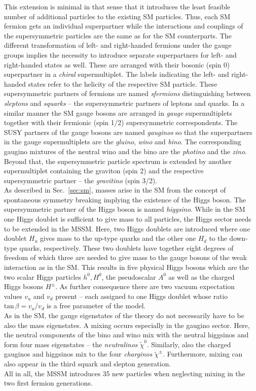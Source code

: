 This extension is minimal in that sense that it introduces the least feasible number of additional particles to the existing SM particles. Thus, each SM fermion gets an individual superpartner while the interactions and couplings of the supersymmetric particles are the same as for the SM counterparts. The different transformation of left- and right-handed fermions under the gauge groups implies the necessity to introduce separate superpartners for left- and right-handed states as well. These are arranged with their bosonic (spin 0) superpartner in a \textit{chiral} supermultiplet. The labels indicating the left- and right-handed states refer to the helicity of the respective SM particle. These supersymmetric partners of fermions are named \textit{sfermions} distinguishing between \textit{sleptons} and \textit{squarks} -- the supersymmetric partners of leptons and quarks. In a similar manner the SM gauge bosons are arranged in \textit{gauge} supermultiplets together with their fermionic (spin 1/2) supersymmetric correspondents. The SUSY partners of the gauge bosons are named \textit{gauginos} so that the superpartners in the gauge supermultiplets are the \textit{gluino}, \textit{wino} and \textit{bino}. The corresponding gaugino mixtures of the neutral wino and the bino are the \textit{photino} and the \textit{zino}. Beyond that, the supersymmetric particle spectrum is extended by another supermultiplet containing the graviton (spin 2) and the respective supersymmetric partner -- the \textit{gravitino} (spin 3/2). \\
As described in Sec.~\ref{sec:sm}, masses arise in the SM from the concept of spontaneous symmetry breaking implying the existence of the Higgs boson. The supersymmetric partner of the Higgs boson is named \textit{higgsino}. While in the SM one Higgs doublet is sufficient to give mass to all particles, the Higgs sector needs to be extended in the MSSM. Here, two Higgs doublets are introduced where one doublet $H_u$ gives mass to the up-type quarks and the other one $H_d$ to the down-type quarks, respectively. These two doublets have together eight degrees of freedom of which three are needed to give mass to the gauge bosons of the weak interaction as in the SM. This results in five physical Higgs bosons which are the two scalar Higgs particles $h^0, H^0$, the pseudoscalar $A^0$ as well as the charged Higgs bosons $H^{\pm}$. As further consequence there are two vacuum expectation values $v_u$ and $v_d$ present -- each assigned to one Higgs doublet whose ratio $\mathrm{tan} \, \beta = v_u/v_d$ is a free parameter of the model. \\
As in the SM, the gauge eigenstates of the theory do not necessarily have to be also the mass eigenstates. A mixing occurs especially in the gaugino sector. Here, the neutral components of the bino and wino mix with the neutral higgsinos and form four mass eigenstates -- the \textit{neutralinos} $\tilde{\chi}^0$. Similarly, also the charged gauginos and higgsinos mix to the four \textit{charginos} $\tilde{\chi}^{\pm}$. Furthermore, mixing can also appear in the third squark and slepton generation. \\
All in all, the MSSM introduces 35 new particles when neglecting mixing in the two first fermion generations.
